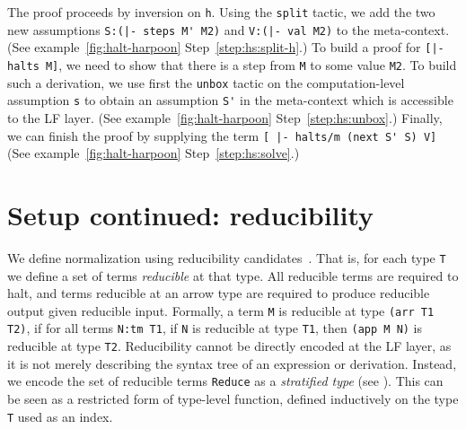 The proof proceeds by inversion on \lstinline!h!.
Using the \lstinline!split! tactic, we add the two new
assumptions \lstinline!S:(|- steps M' M2)! and
\lstinline!V:(|- val M2)!
to the meta-context. %
(See \Harpoon{} example~\ref{fig:halt-harpoon} Step~\ref{step:hs:split-h}.) %
%
To build a proof for \lstinline![|- halts M]!, we need to show that
there is a step from \lstinline!M! to some value \lstinline!M2!. To
build such a derivation, %
we use first the \lstinline!unbox! tactic on the computation-level
assumption \lstinline!s! to obtain an assumption \lstinline!S'! in the
meta-context which is accessible to the LF layer.
(See \Harpoon{} example~\ref{fig:halt-harpoon} Step~\ref{step:hs:unbox}.)
%
%
Finally, we can finish the proof by supplying the term
\lstinline![ |- halts/m (next S' S) V]!
(See \Harpoon{} example~\ref{fig:halt-harpoon} Step~\ref{step:hs:solve}.)


\section{Setup continued: reducibility}
\label{sec:setup-2}

We define normalization using reducibility candidates~\cite{proofs-and-types}.
That is, for each type \lstinline!T! we define a set of terms \emph{reducible}
at that type.
All reducible terms are required to halt, and terms reducible at an arrow type
are required to produce reducible output given reducible input.
Formally,  a term
\lstinline!M! is reducible at type \lstinline!(arr T1 T2)!,
 if for all
terms \lstinline!N:tm T1!, if \lstinline!N! is reducible at type
\lstinline!T1!, then \lstinline!(app M N)! is reducible at type \lstinline!T2!.
Reducibility cannot be directly encoded at the LF layer, as it is not
merely describing the syntax tree of an expression or derivation.
Instead, we encode the set of reducible terms \lstinline!Reduce! as a
\emph{stratified type} (see \cite{JacobRao:stratified2018}).
This can be seen as a restricted form of type-level function, defined
inductively on the type \lstinline!T! used as an index.

